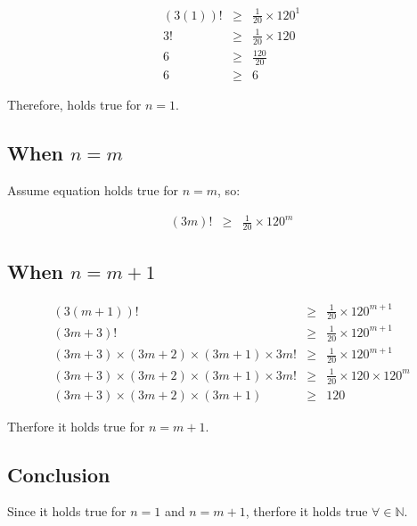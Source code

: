 \documentclass[a4paper,12pt]{article}
\begin{document}
\begin{eqnarray*}
(3(1))! & \geq & \frac{1}{20} \times 120^{1} \\
3! & \geq & \frac{1}{20} \times 120 \\
6 & \geq & \frac{120}{20} \\
6 & \geq & 6
\end{eqnarray*}

\noindent Therefore, holds true for $n = 1$.

\subsection{When $n = m$}

Assume equation holds true for $n = m$, so:

\begin{eqnarray*}
(3m)! & \geq & \frac{1}{20} \times 120^{m}
\end{eqnarray*}

\subsection{When $n = m + 1$}

\begin{eqnarray*}
(3(m + 1))! & \geq & \frac{1}{20} \times 120^{m + 1} \\
(3m + 3)! & \geq & \frac{1}{20} \times 120^{m + 1} \\
(3m + 3) \times (3m + 2) \times (3m + 1) \times 3m! 
& \geq & \frac{1}{20} \times 120^{m + 1} \\
(3m + 3) \times (3m + 2) \times (3m + 1) \times 3m!
& \geq & \frac{1}{20} \times 120 \times 120^{m} \\
(3m + 3) \times (3m + 2) \times (3m + 1) & \geq & 120
\end{eqnarray*}

\noindent Therfore it holds true for $n = m + 1$.

\subsection{Conclusion}

Since it holds true for $n = 1 $ and $n = m + 1$, therfore it holds true
$\forall \in \mathbb{N}$.
\end{document}
